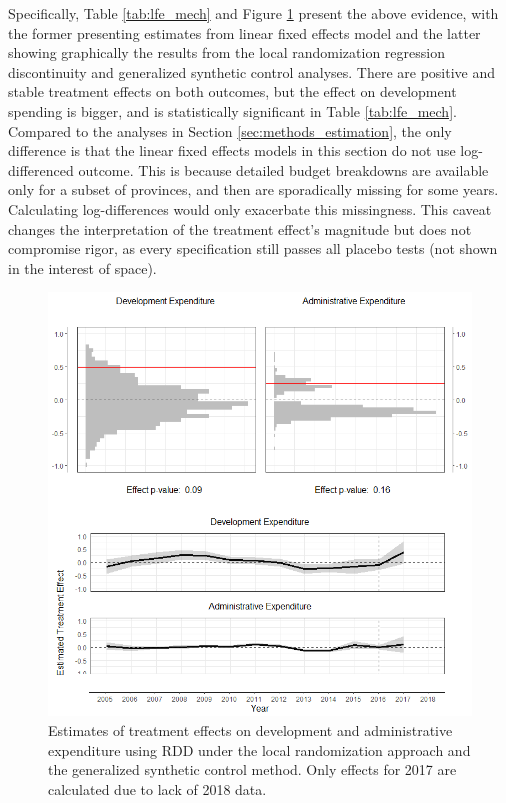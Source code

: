 \documentclass[12pt]{article}
\newcommand{\1}{\mathbbm{1}}
\begin{document}


Specifically, Table \ref{tab:lfe_mech} and Figure \ref{fig:synth_rdd_mech} present the above evidence, with the former presenting estimates from linear fixed effects model and the latter showing graphically the results from the local randomization regression discontinuity and generalized synthetic control analyses. There are positive and stable treatment effects on both outcomes, but the effect on development spending is bigger, and is statistically significant in Table \ref{tab:lfe_mech}. Compared to the analyses in Section \ref{sec:methods_estimation}, the only difference is that the linear fixed effects models in this section do not use log-differenced outcome. This is because detailed budget breakdowns are available only for a subset of provinces, and then are sporadically missing for some years. Calculating log-differences would only exacerbate this missingness. This caveat changes the interpretation of the treatment effect's magnitude but does not compromise rigor, as every specification still passes all placebo tests (not shown in the interest of space).

\begin{figure}[!htbp]
	\centering
	\includegraphics[width=\textwidth]{figure/190618_mech_results.png}
	\captionsetup{singlelinecheck=off}
	\caption[Estimated RDD and synthetic control treatment effects]{Estimates of treatment effects on development and administrative expenditure using RDD under the local randomization approach and the generalized synthetic control method. Only effects for 2017 are calculated due to lack of 2018 data.}
	\label{fig:synth_rdd_mech}
\end{figure}
\end{document}
